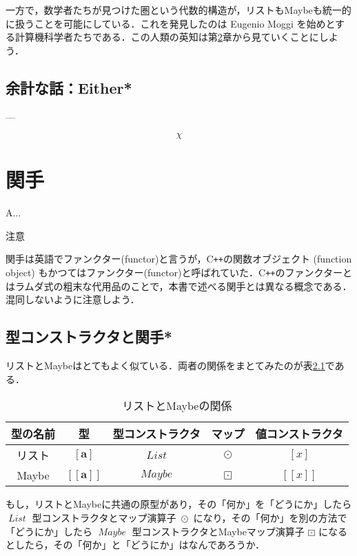 \documentclass[a4paper,draft]{jsbook}
\def\[{\left[\!\left[}
\def\]{\right]\!\right]}
\newcommand{\programminglanguage}[1]{\textsf{#1}}
\newcommand{\cxx}{\programminglanguage{C}\texttt{++}}
\newenvironment{leader}{\begingroup}{\endgroup}
\newenvironment{caution}{\begin{boxnote}\begin{center}注意\end{center}}{\end{boxnote}}
\newcommand{\mType}[1]{\mathbf{#1}}
\newcommand{\mListType}[1]{[\mType{#1}]}
\newcommand{\mMaybeType}[1]{\[\mType{#1}\]}
\newcommand{\mTypeConstructor}[1]{\mathit{#1}} %
\newcommand{\mListWith}[1]{\left[#1\right]}
\newcommand{\mMaybeWith}[1]{\[#1\]}
\DeclareMathOperator{\mMapList}{\odot}
\DeclareMathOperator{\mMapMaybe}{\boxdot}
\DeclareMathOperator{\mListTypeConstructor}{\mTypeConstructor{List}}
\DeclareMathOperator{\mMaybeTypeConstructor}{\mTypeConstructor{Maybe}}
\newcommand{\mathMaybeMap}{\mathbin{\boxdot}}
\begin{document}
一方で，数学者たちが見つけた圏という代数的構造が，リストもMaybeも統一的に扱うことを可能にしている．これを発見したのは Eugenio Moggi を始めとする計算機科学者たちである．この人類の英知は第\ref{ch:functor}章から見ていくことにしよう．


\section{余計な話：Either*}

---

$$\chi$$

\chapter{関手}
\label{ch:functor}

\begin{leader}
A...
\end{leader}

\begin{caution}
関手は英語でファンクター(functor)と言うが，\cxx の関数オブジェクト (function object) もかつてはファンクター(functor)と呼ばれていた．\cxx のファンクターとはラムダ式の粗末な代用品のことで，本書で述べる関手とは異なる概念である．混同しないように注意しよう．
\end{caution}


\section{型コンストラクタと関手*}

リストとMaybeはとてもよく似ている．両者の関係をまとてみたのが表\ref{tab:list-and-maybe}である．

\begin{table}
\label{tab:list-and-maybe}
\caption{リストとMaybeの関係}
\begin{center}
\begin{tabular}{||c|c|c|c|c||}\hline
型の名前&型&型コンストラクタ&マップ&値コンストラクタ\\\hline\hline
リスト&$\mListType{a}$&$\mListTypeConstructor$&$\mMapList$&$\mListWith{x}$\\
Maybe&$\mMaybeType{a}$&$\mMaybeTypeConstructor$&$\mMapMaybe$&$\mMaybeWith{x}$\\\hline
\end{tabular}
\end{center}
\end{table}

もし，リストとMaybeに共通の原型があり，その「何か」を「どうにか」したら $\mListTypeConstructor$ 型コンストラクタとマップ演算子 $\mMapList$ になり，その「何か」を別の方法で「どうにか」したら $\mMaybeTypeConstructor$ 型コンストラクタとMaybeマップ演算子 $\mathMaybeMap$ になるとしたら，その「何か」と「どうにか」はなんであろうか．
\end{document}
